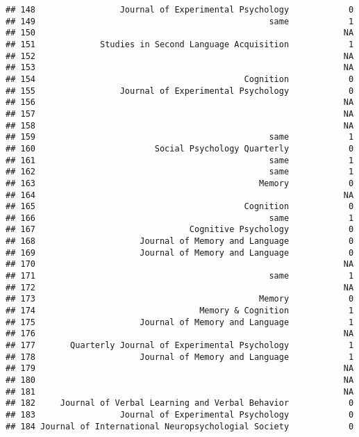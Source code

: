 \documentclass[
  english,
  man]{apa6}
\begin{document}
\begin{verbatim}
## 148                 Journal of Experimental Psychology            0
## 149                                               same            1
## 150                                                              NA
## 151             Studies in Second Language Acquisition            1
## 152                                                              NA
## 153                                                              NA
## 154                                          Cognition            0
## 155                 Journal of Experimental Psychology            0
## 156                                                              NA
## 157                                                              NA
## 158                                                              NA
## 159                                               same            1
## 160                        Social Psychology Quarterly            0
## 161                                               same            1
## 162                                               same            1
## 163                                             Memory            0
## 164                                                              NA
## 165                                          Cognition            0
## 166                                               same            1
## 167                               Cognitive Psychology            0
## 168                     Journal of Memory and Language            0
## 169                     Journal of Memory and Language            0
## 170                                                              NA
## 171                                               same            1
## 172                                                              NA
## 173                                             Memory            0
## 174                                 Memory & Cognition            1
## 175                     Journal of Memory and Language            1
## 176                                                              NA
## 177       Quarterly Journal of Experimental Psychology            1
## 178                     Journal of Memory and Language            1
## 179                                                              NA
## 180                                                              NA
## 181                                                              NA
## 182     Journal of Verbal Learning and Verbal Behavior            0
## 183                 Journal of Experimental Psychology            0
## 184 Journal of International Neuropsychologial Society            0

\end{verbatim}
\end{document}
